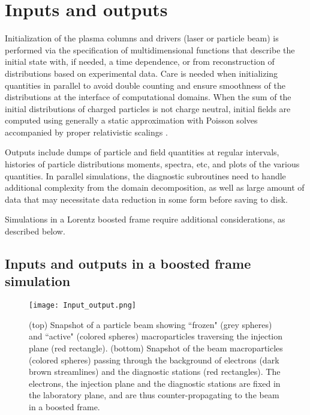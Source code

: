 %
%



\section{Inputs and outputs}

Initialization of the plasma columns and drivers (laser or particle beam) is performed via the specification of multidimensional functions that describe the initial state with, if needed, a time dependence, or from reconstruction of distributions based on experimental data. Care is needed when initializing quantities in parallel to avoid double counting and ensure smoothness of the distributions at the interface of computational domains. When the sum of the initial distributions of charged particles is not charge neutral, initial fields are computed using generally a static approximation with Poisson solves accompanied by proper relativistic scalings \cite{Vaypop2008, CowanPRSTAB13}.

Outputs include dumps of particle and field quantities at regular intervals, histories of particle distributions moments, spectra, etc, and plots of the various quantities. In parallel simulations, the diagnostic subroutines need to handle additional complexity from the domain decomposition, as well as large amount of data that may necessitate data reduction in some form before saving to disk.

Simulations in a Lorentz boosted frame require additional considerations, as described below.

\subsection{Inputs and outputs in a boosted frame simulation}
\begin{figure}
   \texttt{[image: Input\_output.png]}
   \caption{(top) Snapshot of a particle beam showing ``frozen" (grey spheres) and ``active" (colored spheres) macroparticles traversing the injection plane (red rectangle). (bottom) Snapshot of the beam macroparticles (colored spheres) passing through the background of electrons (dark brown streamlines) and the diagnostic stations (red rectangles). The electrons, the injection plane and the diagnostic stations are fixed in the laboratory plane, and are thus counter-propagating to the beam in a boosted frame. }
   \label{Fig_inputoutput}
\end{figure}

